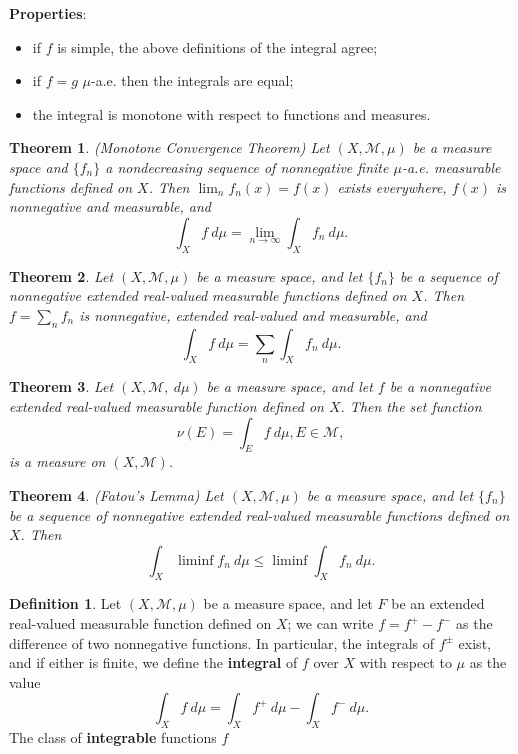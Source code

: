 \documentclass[11pt]{amsart}
\newtheorem*{theorem*}{Theorem}
\theoremstyle{definition}
\newtheorem*{definition*}{Definition}
\renewcommand\leq{\leqslant}
\renewcommand\:{\colon}
\newcommand{\calM}{\mathcal{M}}
\newcommand{\dmu}{\ d\mu}
\begin{document}
\noindent \textbf{Properties}:
\begin{itemize}[leftmargin=*]\setlength\itemsep{0em}
	\item if $f$ is simple, the above definitions of the integral agree;
	\item if $f = g$ $\mu$-a.e. then the integrals are equal;
	\item the integral is monotone with respect to functions and measures.
\end{itemize}

\begin{theorem*}
	\textnormal{(Monotone Convergence Theorem)} Let $(X, \calM, \mu)$ be a measure space and $\{f_n\}$ a nondecreasing sequence of nonnegative finite $\mu$-a.e. measurable functions defined on $X$. Then $\lim_n f_n(x) = f(x)$ exists everywhere, $f(x)$ is nonnegative and measurable, and 
		\[ \int_X f \dmu = \lim_{n\to\infty} \int_X f_n \dmu. \]
\end{theorem*}

\begin{theorem*}
	Let $(X, \calM, \mu)$ be a measure space, and let $\{f_n\}$ be a sequence of nonnegative extended real-valued measurable functions defined on $X$. Then $f = \sum_n f_n$ is nonnegative, extended real-valued and measurable, and 
		\[ \int_X f \dmu = \sum_n \int_X f_n \dmu. \]
\end{theorem*}

\begin{theorem*}
	Let $(X, \calM, \dmu)$ be a measure space, and let $f$ be a nonnegative extended real-valued measurable function defined on $X$. Then the set function \[ \nu(E) = \int_E f\dmu, E \in \calM,\] is a measure on $(X, \calM)$.
\end{theorem*}

\begin{theorem*}
	\textnormal{(Fatou's Lemma)} Let $(X, \calM, \mu)$ be a measure space, and let $\{f_n\}$ be a sequence of nonnegative extended real-valued measurable functions defined on $X$. Then 
		\[ \int_X \liminf f_n \dmu \leq \liminf \int_X f_n \dmu. \]
\end{theorem*}

\begin{definition*}
	Let $(X, \calM, \mu)$ be a measure space, and let $F$ be an extended real-valued measurable function defined on $X$; we can write $f = f^+ - f^-$ as the difference of two nonnegative functions. In particular, the integrals of $f^\pm$ exist, and if either is finite, we define the \textbf{integral} of $f$ over $X$ with respect to $\mu$ as the value
		\[ \int_X f\dmu = \int_X f^+ \dmu - \int_X f^-\dmu. \]
	The class of \textbf{integrable} functions $f$ 
\end{definition*}
\end{document}

